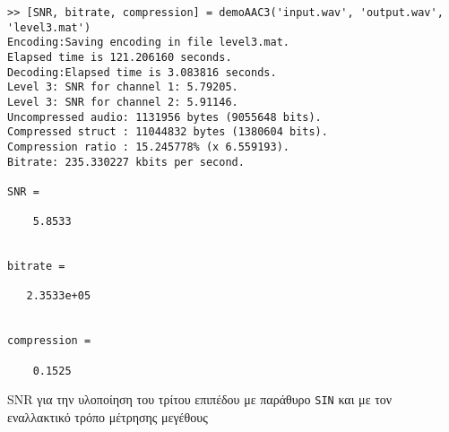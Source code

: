 \begin{code}
\begin{verbatim}
>> [SNR, bitrate, compression] = demoAAC3('input.wav', 'output.wav', 'level3.mat')
Encoding:Saving encoding in file level3.mat.
Elapsed time is 121.206160 seconds.
Decoding:Elapsed time is 3.083816 seconds.
Level 3: SNR for channel 1: 5.79205.
Level 3: SNR for channel 2: 5.91146.
Uncompressed audio: 1131956 bytes (9055648 bits).
Compressed struct : 11044832 bytes (1380604 bits).
Compression ratio : 15.245778% (x 6.559193).
Bitrate: 235.330227 kbits per second.

SNR =

    5.8533


bitrate =

   2.3533e+05


compression =

    0.1525
\end{verbatim}
\caption{SNR για την υλοποίηση του τρίτου επιπέδου με παράθυρο \texttt{SIN} και με τον εναλλακτικό τρόπο μέτρησης μεγέθους}
\end{code}
